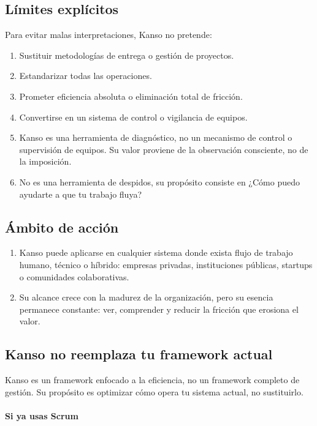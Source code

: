 \subsection*{Límites explícitos}

Para evitar malas interpretaciones, Kanso no pretende:

\begin{enumerate}
    \item Sustituir metodologías de entrega o gestión de proyectos.
    \item Estandarizar todas las operaciones.
    \item Prometer eficiencia absoluta o eliminación total de fricción.
    \item Convertirse en un sistema de control o vigilancia de equipos.
    \item Kanso es una herramienta de diagnóstico, no un mecanismo de control o supervisión de equipos. Su valor proviene de la observación consciente, no de la imposición.
    \item No es una herramienta de despidos, su propósito consiste en ¿Cómo puedo ayudarte a que tu trabajo fluya?
\end{enumerate}

\subsection*{Ámbito de acción}
\begin{enumerate}
    \item Kanso puede aplicarse en cualquier sistema donde exista flujo de trabajo humano, técnico o híbrido: empresas privadas, instituciones públicas, startups o comunidades colaborativas.
    \item Su alcance crece con la madurez de la organización, pero su esencia permanece constante: ver, comprender y reducir la fricción que erosiona el valor.
\end{enumerate}


\subsection*{Kanso no reemplaza tu framework actual}

Kanso es un framework enfocado a la eficiencia, no un framework completo de gestión. 
Su propósito es optimizar cómo opera tu sistema actual, no sustituirlo.

\paragraph{Si ya usas Scrum}

